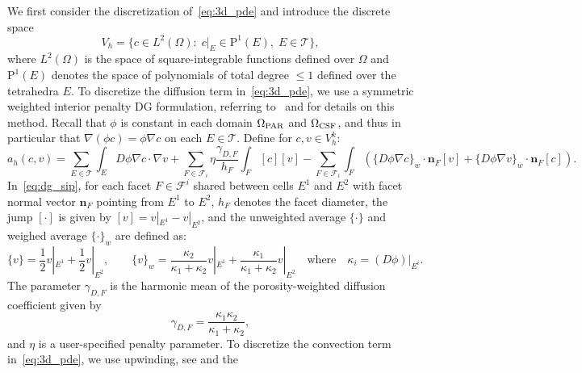 We first consider the discretization of~\eqref{eq:3d_pde} and
introduce the discrete space
\begin{equation}
  V_h = \{c \in L^2(\Omega): \;  c \vert_E \in \mathrm{P}^1(E), \; E \in \mathcal{T}\} ,
\end{equation}
where $L^2(\Omega)$ is the space of square-integrable functions
defined over $\Omega$ and $\mathrm{P}^1(E)$ denotes the space of
polynomials of total degree $\leqslant 1$ defined over the tetrahedra
$E$. To discretize the diffusion term in~\eqref{eq:3d_pde}, we use a
symmetric weighted interior penalty DG formulation, referring
to~\cite{ern2009discontinuous} and \cite[Section
  4.5.2.3]{di2011mathematical} for details on this
method. Recall that $\phi$ is constant in each domain
  $\Omega_{\rm PAR}$ and $\Omega_{\rm CSF}$, and thus in particular
  that $\nabla (\phi c) = \phi \nabla c$ on each $E \in \mathcal{T}$.
Define for $c, v \in V_h^k$:
\begin{equation}
  a_h (c, v)
  =
  \sum_{E \in \mathcal{T}} \int_{E} D\phi \nabla c \cdot \nabla v
  + \sum_{F \in \mathcal{F}_i} \eta \frac{\gamma_{D,F}}{h_F} \int_{F} [c][v] 
  - \sum_{F \in \mathcal{F}_i} \int_{F} \left( \{D \phi \nabla c \}_w \cdot \bm n_F [v]
  + \{D \phi \nabla v \}_w \cdot \bm n_F [c] \right).
  \label{eq:dg_sip}
\end{equation}
In~\eqref{eq:dg_sip}, for each facet $F \in \mathcal{F}^i$ shared
between cells $E^1$ and $E^2$ with facet normal vector $\bm n_F$
pointing from $E^1$ to $E^2$, $h_F$ denotes the facet diameter,
the jump $[\cdot]$ is given by $[v] = v|_{E^1} - v|_{E^2}$, and the
unweighted average $\{ \cdot \}$ and weighed average $\{ \cdot \}_w$
are defined as:
\begin{equation}
  \{v\} = \frac12 v |_{E^1} + \frac12 v |_{E^2}, \qquad
  \{v\}_{w} = \frac{\kappa_2}{\kappa_1 + \kappa_2} v |_{E^1} + \frac{\kappa_1}{\kappa_1 + \kappa_2} v |_{E^2}
  \quad \text{where} \quad \kappa_i = (D \phi) |_{E^i}.  
\end{equation}
The parameter $\gamma_{D,F}$ is the harmonic mean of the
porosity-weighted diffusion coefficient given by
\begin{equation}
  \gamma_{D,F} = \frac{\kappa_1\kappa_2}{\kappa_1 + \kappa_2},
\end{equation}
and $\eta$ is a user-specified penalty parameter. To discretize the convection term in~\eqref{eq:3d_pde}, we use
upwinding, see \cite[Section 2.3.1]{di2011mathematical} and the
